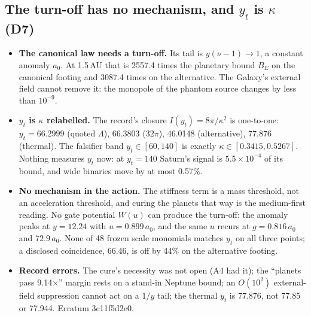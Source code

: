 \documentclass[10pt]{article}
\begin{document}
\subsection{The turn-off has no mechanism, and $y_t$ is $\kappa$ (D7)}
\begin{itemize}
\item \textbf{The canonical law needs a turn-off.} Its tail is $y(\nu-1)\to1$, a constant anomaly $a_0$. At 1.5\,AU that is 2557.4 times the planetary bound $B_E$ on the canonical footing and 3087.4 times on the alternative. The Galaxy's external field cannot remove it: the monopole of the phantom source changes by less than $10^{-9}$.
\item \textbf{$y_t$ is $\kappa$ relabelled.} The record's closure $I(y_t)=8\pi/\kappa^2$ is one-to-one: $y_t=66.2999$ (quoted $\Lambda$), 66.3803 ($32\pi$), 46.0148 (alternative), 77.876 (thermal). The falsifier band $y_t\in[60,140]$ is exactly $\kappa\in[0.3415,0.5267]$. Nothing measures $y_t$ now: at $y_t=140$ Saturn's signal is $5.5\times10^{-4}$ of its bound, and wide binaries move by at most 0.57\%.
\item \textbf{No mechanism in the action.} The stiffness term is a mass threshold, not an acceleration threshold, and curing the planets that way is the medium-first reading. No gate potential $W(u)$ can produce the turn-off: the anomaly peaks at $y=12.24$ with $u=0.899\,a_0$, and the same $u$ recurs at $g=0.816\,a_0$ and $72.9\,a_0$. None of 48 frozen scale monomials matches $y_t$ on all three points; a disclosed coincidence, 66.46, is off by 44\% on the alternative footing.
\item \textbf{Record errors.} The cure's necessity was not open (A4 had it); the ``planets pass 9.14$\times$'' margin rests on a stand-in Neptune bound; an $O(10^2)$ external-field suppression cannot act on a $1/y$ tail; the thermal $y_t$ is 77.876, not 77.85 or 77.944. Erratum 3c11f5d2e0.
\end{itemize}
\end{document}
